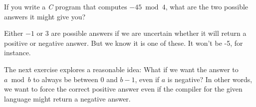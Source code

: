 \begin{exer}
If you write a {\em C} program that computes $-45\bmod 4$, what are the two possible answers it might give you?\\
\answerline
\begin{answer}
Either $-1$ or $3$ are possible answers if we are uncertain whether it will return a positive
or negative answer.  But we know it is one of these.  It won't be -5, for instance.
\end{answer} 
\end{exer}

The next exercise explores a reasonable idea:  What if we want the answer to $ a\bmod b$ to 
always be between $0$ and $b-1$, even if $a$ is negative?  In other words, we want to
force the correct positive answer even if the compiler for the given language might return a
negative answer.

